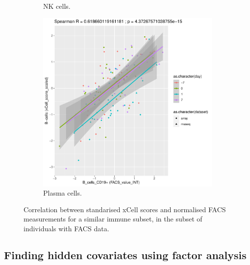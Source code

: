 \begin{figure}
\begin{subfigure}[b]{0.43\textwidth}
        \caption{\gls{NK} cells.}
    \end{subfigure}%
    \vspace{1em}\vfill%
    \begin{subfigure}[b]{0.43\textwidth}
        \centering
        \includegraphics[width=1.0\textwidth,page=2]{mainmatter/figures/chapter_03/validate_xCell_estimates.cell_type_pairs.pdf}
        \caption{Plasma cells.}
    \end{subfigure}%
    \caption{Correlation between standarised xCell scores and normalised \gls{FACS} measurements for a similar immune subset, in the subset of individuals with \gls{FACS} data.}
    \label{fig:hird_xCell_vs_FACS}
\end{figure}

\subsection{Finding hidden covariates using factor analysis}

%

